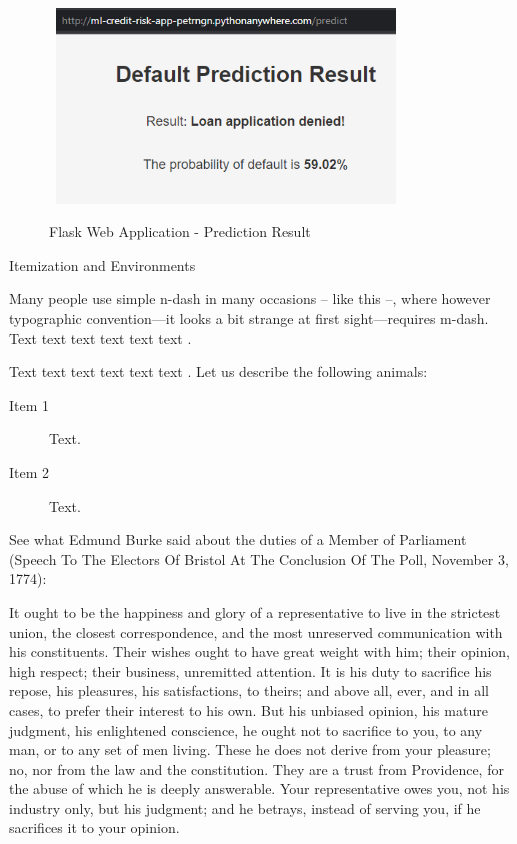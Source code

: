 \begin{figure}[H]
    \centering
    \caption{Flask Web Application - Prediction Result}\vspace{0.5em}
    \label{fig:shap}\
    \includegraphics[width=90mm]{Figures/flask_app_result.jpg}

    \vspace{-1em}
\end{figure}

Itemization and Environments

Many people use simple n-dash in many occasions -- like this --, where however typographic convention---it looks a bit strange at first sight---requires m-dash.
Text text text text text text \citet{Haufler2006}. 

Text text text text text text \citet{Wells2001}. Let us describe the following animals:

\begin{description}
\item[Item 1] Text.
\item[Item 2] Text.
\end{description}

See what Edmund Burke said about the duties of a Member of Parliament (Speech To The Electors Of Bristol At The Conclusion Of The Poll, November 3, 1774):

\begin{quotesmall}
It ought to be the happiness and glory of a representative to live in the strictest union, the closest correspondence, and the most unreserved communication with his constituents. 
Their wishes ought to have great weight with him; their opinion, high respect; their business, unremitted attention.
It is his duty to sacrifice his repose, his pleasures, his satisfactions, to theirs; and above all, ever, and in all cases, to prefer their interest to his own.
But his unbiased opinion, his mature judgment, his enlightened conscience, he ought not to sacrifice to you, to any man, or to any set of men living.
These he does not derive from your pleasure; no, nor from the law and the constitution.
They are a trust from Providence, for the abuse of which he is deeply answerable.
Your representative owes you, not his industry only, but his judgment; and he betrays, instead of serving you, if he sacrifices it to your opinion.
\end{quotesmall}

